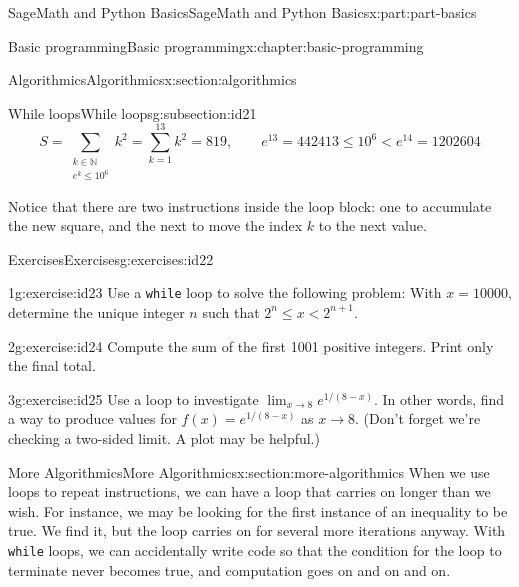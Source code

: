 \documentclass[oneside,10pt,]{book}
\newcommand{\mono}[1]{\texttt{#1}}
\numberwithin{equation}{section}
\begin{document}
\begin{partptx}{SageMath and Python Basics}{}{SageMath and Python Basics}{}{}{x:part:part-basics}
\begin{chapterptx}{Basic programming}{}{Basic programming}{}{}{x:chapter:basic-programming}
\begin{sectionptx}{Algorithmics}{}{Algorithmics}{}{}{x:section:algorithmics}
\begin{subsectionptx}{While loops}{}{While loops}{}{}{g:subsection:id21}
\begin{equation*}
S = \sum_{\substack{k\in\mathbb{N}\\e^k\le 10^6}} k^2 = \sum_{k=1}^{13} k^2 = 819, 
\qquad e^{13} = 442413\le 10^6 < e^{14} = 1202604
\end{equation*}
%
\par
Notice that there are two instructions inside the loop block: one to accumulate the new square, and the next to move the index \(k\) to the next value.%
\end{subsectionptx}
%
%
\typeout{************************************************}
\typeout{************************************************}
%
\begin{exercises-subsection}{Exercises}{}{Exercises}{}{}{g:exercises:id22}
\begin{divisionexercise}{1}{}{}{g:exercise:id23}%
Use a \mono{while} loop to solve the following problem: With \(x = 10000\), determine the unique integer \(n\) such that \(2^n\le x < 2^{n+1}\).\end{divisionexercise}%
\begin{divisionexercise}{2}{}{}{g:exercise:id24}%
Compute the sum of the first 1001 positive integers. Print only the final total.\end{divisionexercise}%
\begin{divisionexercise}{3}{}{}{g:exercise:id25}%
Use a loop to investigate \(\lim_{x\to 8} e^{1/(8-x)}\). In other words, find a way to produce values for \(f(x) = e^{1/(8-x)}\) as \(x\to 8\). (Don't forget we're checking a two-sided limit. A plot may be helpful.)\end{divisionexercise}%
\end{exercises-subsection}
\end{sectionptx}
%
%
\typeout{************************************************}
\typeout{************************************************}
%
\begin{sectionptx}{More Algorithmics}{}{More Algorithmics}{}{}{x:section:more-algorithmics}
When we use loops to repeat instructions, we can have a loop that carries on longer than we wish. For instance, we may be looking for the first instance of an inequality to be true. We find it, but the loop carries on for several more iterations anyway. With \mono{while} loops, we can accidentally write code so that the condition for the loop to terminate never becomes true, and computation goes on and on and on.%
%
%
\typeout{************************************************}

\end{sectionptx}
\end{chapterptx}
\end{partptx}
\end{document}
